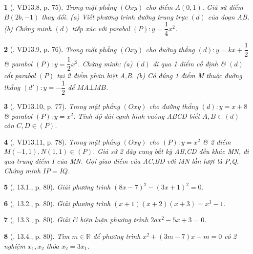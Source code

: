\documentclass{article}
\newtheorem{baitoan}{}
\begin{document}
\begin{baitoan}[\cite{TLCT_THCS_Toan_9_dai_so}, VD13.8, p. 75]
	Trong mặt phẳng $(Oxy)$ cho điểm $A(0,1)$. Giả sử điểm $B(2b,-1)$ thay đổi. (a) Viết phương trình đường trung trực $(d)$ của đoạn AB. (b) Chứng minh $(d)$ tiếp xúc với parabol $(P):y = \dfrac{1}{4}x^2$.
\end{baitoan}

\begin{baitoan}[\cite{TLCT_THCS_Toan_9_dai_so}, VD13.9, p. 76]
	Trong mặt phẳng $(Oxy)$ cho đường thẳng $(d):y = kx + \dfrac{1}{2}$ \& parabol $(P):y = \dfrac{1}{2}x^2$. Chứng minh: (a) $(d)$ đi qua 1 điểm cố định \& $(d)$ cắt parabol $(P)$ tại 2 điểm phân biệt A,B. (b) Có đúng 1 điểm M thuộc đường thẳng $(d'):y = -\dfrac{1}{2}$ để $MA\bot MB$.
\end{baitoan}

\begin{baitoan}[\cite{TLCT_THCS_Toan_9_dai_so}, VD13.10, p. 77]
	Trong mặt phẳng $(Oxy)$ cho đường thẳng $(d):y = x + 8$ \& parabol $(P):y = x^2$. Tính độ dài cạnh hình vuông ABCD biết $A,B\in(d)$ còn $C,D\in(P)$.
\end{baitoan}

\begin{baitoan}[\cite{TLCT_THCS_Toan_9_dai_so}, VD13.11, p. 78]
	Trong mặt phẳng $(Oxy)$ cho $(P):y = x^2$ \& 2 điểm $M(-1,1),N(1,1)\in(P)$. Giả sử 2 dây cung bất kỳ AB,CD đều khác MN, đi qua trung điểm I của MN. Gọi giao điểm của AC,BD với MN lần lượt là P,Q. Chứng minh $IP = IQ$. 
\end{baitoan}

\begin{baitoan}[\cite{TLCT_THCS_Toan_9_dai_so}, 13.1., p. 80]
	Giải phương trình $(8x - 7)^2 - (3x + 1)^2 = 0$.
\end{baitoan}

\begin{baitoan}[\cite{TLCT_THCS_Toan_9_dai_so}, 13.2., p. 80]
	Giải phương trình $(x + 1)(x + 2)(x + 3) = x^3 - 1$.
\end{baitoan}

\begin{baitoan}[\cite{TLCT_THCS_Toan_9_dai_so}, 13.3., p. 80]
	Giải \& biện luận phương trình $2ax^2 - 5x + 3 = 0$.
\end{baitoan}

\begin{baitoan}[\cite{TLCT_THCS_Toan_9_dai_so}, 13.4., p. 80]
	Tìm $m\in\mathbb{R}$ để phương trình $x^2 + (3m - 7)x + m = 0$ có 2 nghiệm $x_1,x_2$ thỏa $x_2 = 3x_1$.
\end{baitoan}
\end{document}
